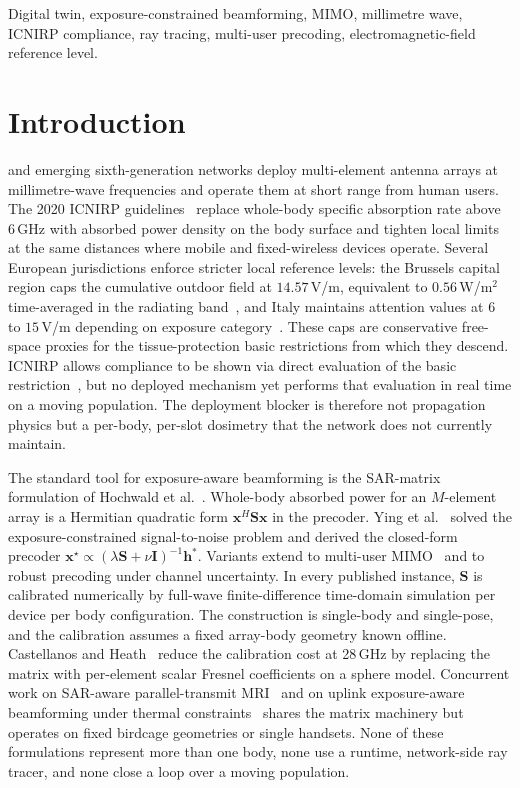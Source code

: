 \documentclass[journal,twocolumn,10pt]{IEEEtran}
\theoremstyle{plain}
\theoremstyle{remark}
\newcommand{\xx}{\mathbf{x}}
\newcommand{\hh}{\mathbf{h}}
\begin{document}
\begin{IEEEkeywords}
Digital twin, exposure-constrained beamforming, MIMO, millimetre wave,
ICNIRP compliance, ray tracing, multi-user precoding,
electromagnetic-field reference level.
\end{IEEEkeywords}

\IEEEpeerreviewmaketitle


\section{Introduction}\label{sec:intro}
 and emerging sixth-generation
networks deploy multi-element antenna arrays at millimetre-wave
frequencies and operate them at short range from human users. The
2020 ICNIRP guidelines~\cite{ICNIRP2020} replace whole-body specific
absorption rate above 6\,GHz with absorbed power density on the body
surface and tighten local limits at the same distances where mobile
and fixed-wireless devices operate. Several European jurisdictions
enforce stricter local reference levels: the Brussels capital region
caps the cumulative outdoor field at $14.57\,$V/m, equivalent to
$0.56\,$W/m$^2$ time-averaged in the radiating
band~\cite{BrusselsArrete2007,BrusselsArrete2024}, and Italy maintains
attention values at $6$ to $15\,$V/m depending on
exposure category~\cite{ItalyDL}. These caps are conservative
free-space proxies for the tissue-protection basic restrictions from
which they descend. ICNIRP allows compliance to be shown via
direct evaluation of the basic restriction~\cite{IEC62232}, but no
deployed mechanism yet performs that evaluation in real time on a
moving population. The deployment blocker is therefore not propagation
physics but a per-body, per-slot dosimetry that the network does not
currently maintain.

The standard tool for exposure-aware beamforming is the SAR-matrix
formulation of Hochwald et al.~\cite{Hochwald2014}. Whole-body
absorbed power for an $M$-element array is a Hermitian quadratic form
$\xx^H \mathbf{S} \xx$ in the precoder. Ying et
al.~\cite{Ying2015} solved the exposure-constrained signal-to-noise
problem and derived the closed-form precoder
$\xx^\star \propto (\lambda \mathbf{S} + \nu \mathbf{I})^{-1} \hh^*$.
Variants extend to multi-user
MIMO~\cite{Ying2017} and to robust precoding under channel
uncertainty. In every published instance, $\mathbf{S}$ is calibrated
numerically by full-wave finite-difference time-domain simulation per
device per body configuration. The construction is single-body and
single-pose, and the calibration assumes a fixed array-body geometry
known offline. Castellanos and Heath~\cite{Castellanos2020} reduce the
calibration cost at 28\,GHz by replacing the matrix with per-element
scalar Fresnel coefficients on a sphere model. Concurrent work on
SAR-aware parallel-transmit MRI~\cite{MeliadoSAR2020,GokyarpTx2023} and
on uplink exposure-aware beamforming under thermal
constraints~\cite{ZhouUL2026} shares the matrix machinery but operates
on fixed birdcage geometries or single handsets. None of these
formulations represent more than one body, none use a runtime,
network-side ray tracer, and none close a loop over a moving
population.
\end{document}
